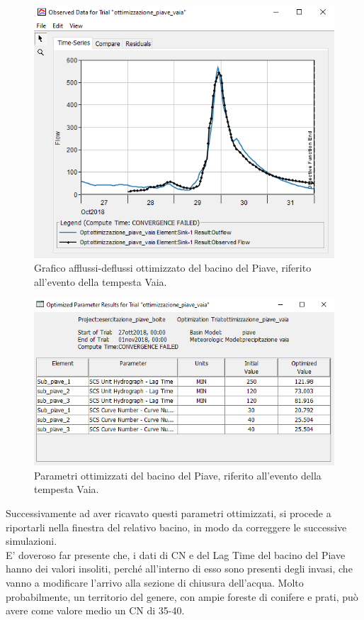 \begin{figure}[H]\centering
    \includegraphics[scale=1]{immagini/ottim_piave.PNG}
    \caption{Grafico afflussi-deflussi ottimizzato del bacino del Piave, riferito all'evento della tempesta Vaia.}
        \label{ottim_piave}    
\end{figure}

\begin{figure}[H]\centering
    \includegraphics[scale=1]{immagini/par_ottimiz_piave.PNG}
    \caption{Parametri ottimizzati del bacino del Piave, riferito all'evento della tempesta Vaia.}
        \label{par_ottim_boite}    
    \end{figure}

Successivamente ad aver ricavato questi parametri ottimizzati, si procede a riportarli nella finestra del relativo bacino, in modo da correggere le successive simulazioni.\\
E' doveroso far presente che, i dati di CN e del Lag Time del bacino del Piave hanno dei valori insoliti, perché all'interno di esso sono presenti degli invasi, che vanno a modificare l'arrivo alla sezione di chiusura dell'acqua. Molto probabilmente, un territorio del genere, con ampie foreste di conifere e prati, può avere come valore medio un CN di 35-40.


